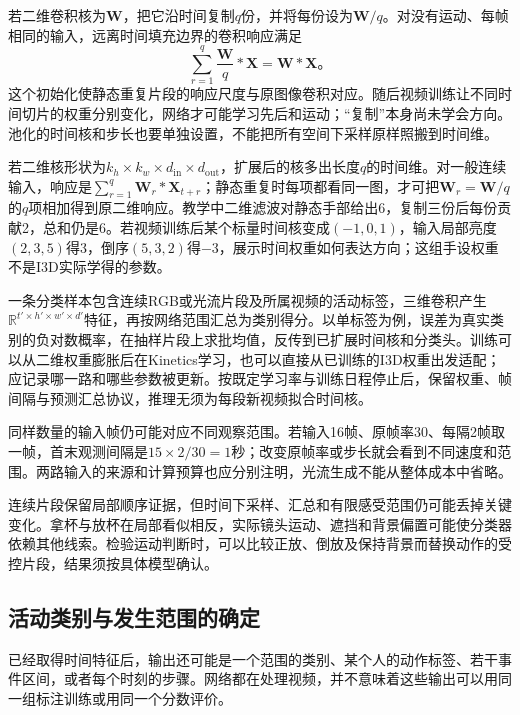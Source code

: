若二维卷积核为$\bm{W}$，把它沿时间复制$q$份，并将每份设为$\bm{W}/q$。对没有运动、每帧相同的输入，远离时间填充边界的卷积响应满足
\begin{equation}
  \sum_{r=1}^{q}\frac{\bm{W}}{q}*\bm{X}
  =\bm{W}*\bm{X}\text{。}
  \label{eq:vision-video-inflation}
\end{equation}
这个初始化使静态重复片段的响应尺度与原图像卷积对应。随后视频训练让不同时间切片的权重分别变化，网络才可能学习先后和运动；“复制”本身尚未学会方向。池化的时间核和步长也要单独设置，不能把所有空间下采样原样照搬到时间维。

若二维核形状为$k_h\times k_w\times d_{\mathrm{in}}\times d_{\mathrm{out}}$，扩展后的核多出长度$q$的时间维。对一般连续输入，响应是$\sum_{r=1}^{q}\bm{W}_r*\bm{X}_{t+r}$；静态重复时每项都看同一图，才可把$\bm{W}_r=\bm{W}/q$的$q$项相加得到原二维响应。教学中二维滤波对静态手部给出6，复制三份后每份贡献2，总和仍是6。若视频训练后某个标量时间核变成$(-1,0,1)$，输入局部亮度$(2,3,5)$得3，倒序$(5,3,2)$得$-3$，展示时间权重如何表达方向；这组手设权重不是I3D实际学得的参数。

一条分类样本包含连续RGB或光流片段及所属视频的活动标签，三维卷积产生$\mathbb{R}^{t'\times h'\times w'\times d'}$特征，再按网络范围汇总为类别得分。以单标签为例，误差为真实类别的负对数概率，在抽样片段上求批均值，反传到已扩展时间核和分类头。训练可以从二维权重膨胀后在Kinetics学习，也可以直接从已训练的I3D权重出发适配；应记录哪一路和哪些参数被更新。按既定学习率与训练日程停止后，保留权重、帧间隔与预测汇总协议，推理无须为每段新视频拟合时间核。

同样数量的输入帧仍可能对应不同观察范围。若输入16帧、原帧率30、每隔2帧取一帧，首末观测间隔是$15\times2/30=1$秒；改变原帧率或步长就会看到不同速度和范围。两路输入的来源和计算预算也应分别注明，光流生成不能从整体成本中省略。

连续片段保留局部顺序证据，但时间下采样、汇总和有限感受范围仍可能丢掉关键变化。拿杯与放杯在局部看似相反，实际镜头运动、遮挡和背景偏置可能使分类器依赖其他线索。检验运动判断时，可以比较正放、倒放及保持背景而替换动作的受控片段，结果须按具体模型确认。

\subsection{活动类别与发生范围的确定}
\label{sec:vision-video-activity-output}

已经取得时间特征后，输出还可能是一个范围的类别、某个人的动作标签、若干事件区间，或者每个时刻的步骤。网络都在处理视频，并不意味着这些输出可以用同一组标注训练或用同一个分数评价。

